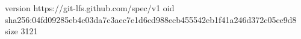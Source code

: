 version https://git-lfs.github.com/spec/v1
oid sha256:04fd09285eb4c03da7c3aec7e1d6cd988ecb455542eb1f41a246d372c05ce9d8
size 3121
